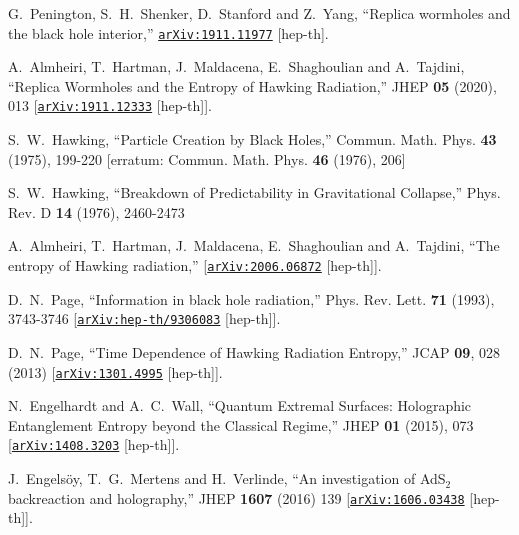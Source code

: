 \documentclass[12pt]{article}
\newcommand \arXiv [1]{\href{http://arxiv.org/abs/#1}{\tt arXiv:#1}}
\begin{document}
\begin{thebibliography}{99}
{\small

  G.~Penington, S.~H.~Shenker, D.~Stanford and Z.~Yang,
  ``Replica wormholes and the black hole interior,''
  \arXiv{1911.11977} [hep-th].
 
  
A.~Almheiri, T.~Hartman, J.~Maldacena, E.~Shaghoulian and A.~Tajdini,
``Replica Wormholes and the Entropy of Hawking Radiation,''
JHEP \textbf{05} (2020), 013
[\arXiv{1911.12333} [hep-th]].

S.~W.~Hawking,
``Particle Creation by Black Holes,''
Commun. Math. Phys. \textbf{43} (1975), 199-220
[erratum: Commun. Math. Phys. \textbf{46} (1976), 206]

S.~W.~Hawking,
``Breakdown of Predictability in Gravitational Collapse,''
Phys. Rev. D \textbf{14} (1976), 2460-2473

A.~Almheiri, T.~Hartman, J.~Maldacena, E.~Shaghoulian and A.~Tajdini,
``The entropy of Hawking radiation,''
[\arXiv{2006.06872} [hep-th]].

D.~N.~Page,
``Information in black hole radiation,''
Phys. Rev. Lett. \textbf{71} (1993), 3743-3746
[\arXiv{hep-th/9306083} [hep-th]].

D.~N.~Page,
``Time Dependence of Hawking Radiation Entropy,''
JCAP \textbf{09}, 028 (2013)
[\arXiv{1301.4995} [hep-th]].

N.~Engelhardt and A.~C.~Wall,
``Quantum Extremal Surfaces: Holographic Entanglement Entropy beyond the Classical Regime,''
JHEP \textbf{01} (2015), 073
[\arXiv{1408.3203} [hep-th]].

  J.~Engelsöy, T.~G.~Mertens and H.~Verlinde,
  ``An investigation of AdS$_{2}$ backreaction and holography,''
  JHEP {\bf 1607} (2016) 139
  [\arXiv{1606.03438} [hep-th]].


}
\end{thebibliography}
\end{document}
